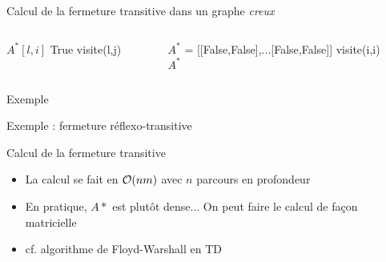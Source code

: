 \begin{frame}{Calcul de la fermeture transitive dans un graphe \emph{creux}}
    \begin{columns}
    \begin{column}{0.5\textwidth}
        \begin{algorithmic}
            \State $A^*[l,i]$ \gets True 
                \State visite(l,j)
            \EndIf
            \EndFor
            \EndFunction
        \end{algorithmic}
    \end{column}
    \begin{column}{0.5\textwidth}
        \begin{algorithmic}
                \State $A^*$ = [[False,False],...[False,False]]
                    \State visite(i,i)
                \EndFor \\
            \Return $A^*$
            \EndFunction
        \end{algorithmic}
    \end{column}
    \end{columns}
    \end{frame}
    
    \begin{frame}{Exemple}
    \begin{center}
        
    \end{center}
    \end{frame}
    
    \begin{frame}{Exemple : fermeture réflexo-transitive}
    \begin{center}
        
    \end{center}
        \end{frame}
    
    \begin{frame}{Calcul de la fermeture transitive}
    \begin{itemize}
        \item La calcul se fait en ${\cal O}(nm)$ avec $n$ parcours en profondeur
        \item En pratique, $A*$ est plutôt dense... On peut faire le calcul de façon matricielle
        \item cf. algorithme de Floyd-Warshall en TD 
    \end{itemize}
    \end{frame}
    
